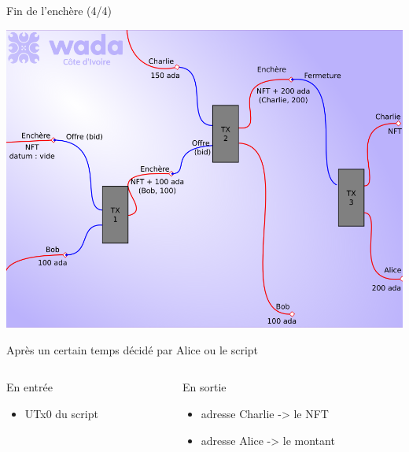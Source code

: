 \documentclass[presentation]{beamer}
\begin{document}
\begin{frame}[label={sec:org39e36d5}]{Fin de l'enchère (4/4)}
      \begin{center}
\includegraphics[height=.55\textheight]{Images/enchere_04.png}
\end{center}
Après un certain temps décidé par Alice ou le script
\begin{columns}
\begin{column}{0.3\columnwidth}
\begin{block}{En entrée}
\begin{itemize}
\item UTx0 du script
\end{itemize}
\end{block}
\end{column}
\begin{column}{0.7\columnwidth}
\begin{block}{En sortie}
\begin{itemize}
\item adresse Charlie -> le NFT
\item adresse Alice -> le montant
\end{itemize}
\end{block}
\end{column}
\end{columns}
\end{frame}
\end{document}
